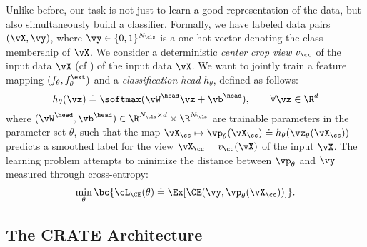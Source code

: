 \documentclass[../../book-main.tex]{subfiles}
\begin{document}
Unlike before, our task is not just to learn a good representation of the data, but also simultaneously build a classifier. Formally, we have labeled data pairs \((\vX, \vy)\), where \(\vy \in \{0, 1\}^{N_{\cls}}\) is a one-hot vector denoting the class membership of \(\vX\). We consider a deterministic \textit{center crop view} \(v_{\cc}\) of the input data \(\vX\) (cf ) of the input data \(\vX\). We want to jointly train a feature mapping \((f_{\theta}, f_{\theta}^{\ext})\) and a \textit{classification head} \(h_{\theta}\), defined as follows:
\begin{equation}
    h_{\theta}(\vz) \doteq \softmax(\vW^{\head}\vz + \vb^{\head}), \qquad  \forall \vz \in \R^{d}
\end{equation}
where \((\vW^{\head}, \vb^{\head}) \in \R^{N_{\cls} \times d} \times \R^{N_{\cls}}\) are trainable parameters in the parameter set \(\theta\), such that the map \(\vX_{\cc} \mapsto \vp_{\theta}(\vX_{\cc}) \doteq h_{\theta}(\vz_{\theta}(\vX_{\cc}))\) predicts a smoothed label for the view \(\vX_{\cc} = v_{\cc}(\vX)\) of the input \(\vX\). The learning problem attempts to minimize the distance between \(\vp_{\theta}\) and \(\vy\) measured through cross-entropy:
\begin{equation}\label{eq:classification_ce_loss}
    \min_{\theta}\bc{\cL_{\CE}(\theta) \doteq \Ex[\CE(\vy, \vp_{\theta}(\vX_{\cc}))]}.
\end{equation}


\subsection{The CRATE Architecture}\label{sub:image_classification_architecture}
\end{document}
